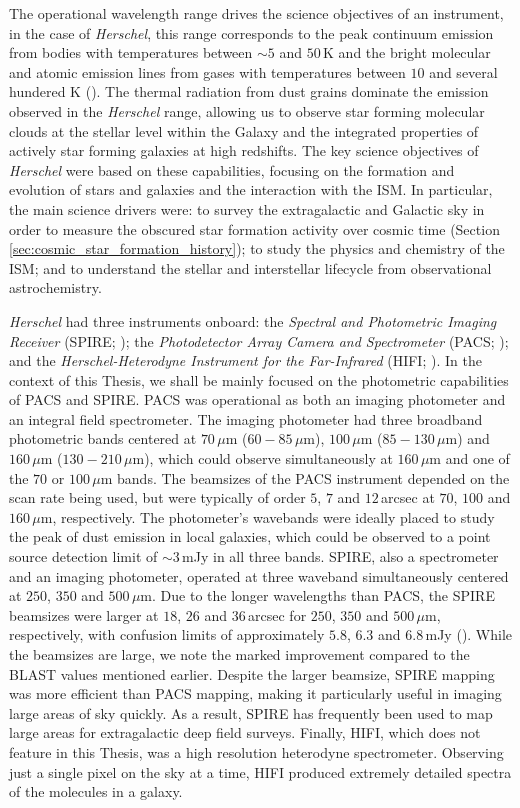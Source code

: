 The operational wavelength range drives the science objectives of an instrument, in the case of \textit{Herschel}, this range corresponds to the peak continuum emission from bodies with temperatures between $\sim5$ and $50\,$K and the bright molecular and atomic emission lines from gases with temperatures between $10$ and several hundered K (\citealt{Pilbratt_2008}). The thermal radiation from dust grains dominate the emission observed in the \textit{Herschel} range, allowing us to observe star forming molecular clouds at the stellar level within the Galaxy and the integrated properties of actively star forming galaxies at high redshifts. The key science objectives of \textit{Herschel} were based on these capabilities, focusing on the formation and evolution of stars and galaxies and the interaction with the ISM. In particular, the main science drivers were: to survey the extragalactic and Galactic sky in order to measure the obscured star formation activity over cosmic time (Section \ref{sec:cosmic_star_formation_history}); to study the physics and chemistry of the ISM; and to understand the stellar and interstellar lifecycle from observational astrochemistry.

\textit{Herschel} had three instruments onboard: the \textit{Spectral and Photometric Imaging Receiver} (SPIRE; \citealt{Griffin_2010}); the \textit{Photodetector Array Camera and Spectrometer} (PACS; \citealt{Poglitsch_2010}); and the \textit{Herschel-Heterodyne Instrument for the Far-Infrared} (HIFI; \citealt{deGraauw_2010}). In the context of this Thesis, we shall be mainly focused on the photometric capabilities of PACS and SPIRE. PACS was operational as both an imaging photometer and an integral field spectrometer. The imaging photometer had three broadband photometric bands centered at $70\,\mu$m ($60 - 85\,\mu$m), $100\,\mu$m ($85 - 130\,\mu$m) and $160\,\mu$m ($130 - 210\,\mu$m), which could observe simultaneously at $160\,\mu$m and one of the $70$ or $100\,\mu$m bands. The beamsizes of the PACS instrument depended on the scan rate being used, but were typically of order $5$, $7$ and $12\,$arcsec at $70$, $100$ and $160\,\mu$m, respectively. The photometer's wavebands were ideally placed to study the peak of dust emission in local galaxies, which could be observed to a point source detection limit of $\sim 3\,$mJy in all three bands. SPIRE, also a spectrometer and an imaging photometer, operated at three waveband simultaneously centered at $250$, $350$ and $500\,\mu$m. Due to the longer wavelengths than PACS, the SPIRE beamsizes were larger at $18$, $26$ and $36\,$arcsec for $250$, $350$ and $500\,\mu$m, respectively, with confusion limits of approximately $5.8$, $6.3$ and $6.8\,$mJy (\citealt{Casey_2014b}). While the beamsizes are large, we note the marked improvement compared to the BLAST values mentioned earlier. Despite the larger beamsize, SPIRE mapping was more efficient than PACS mapping, making it particularly useful in imaging large areas of sky quickly. As a result, SPIRE has frequently been used to map large areas for extragalactic deep field surveys. Finally, HIFI, which does not feature in this Thesis, was a high resolution heterodyne spectrometer. Observing just a single pixel on the sky at a time, HIFI produced extremely detailed spectra of the molecules in a galaxy.

